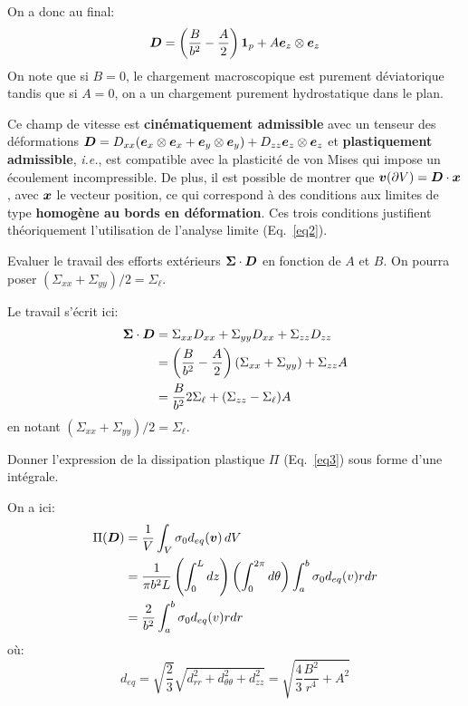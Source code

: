 \documentclass[french,12pt]{exam}
\begin{document}
\begin{questions}
\begin{solution}
On a donc au final:
$$\boldsymbol{D} = \left(\dfrac{B}{b^2}- \dfrac{A}{2}\right)\boldsymbol{1}_p + A\boldsymbol{e}_z\otimes\boldsymbol{e}_z$$
On note que si $B=0$, le chargement macroscopique est purement déviatorique tandis que si $A=0$, on a un chargement purement hydrostatique dans le plan.
\end{solution}

Ce champ de vitesse est \textbf{cinématiquement admissible} avec un tenseur des déformations $\boldsymbol{D} = D_{xx} (\boldsymbol{e}_x \otimes \boldsymbol{e}_x + \boldsymbol{e}_y \otimes \boldsymbol{e}_y) + D_{zz} \boldsymbol{e}_z \otimes \boldsymbol{e}_z $ et \textbf{plastiquement admissible}, \textit{i.e.}, est compatible avec la plasticité de von Mises qui impose un écoulement incompressible. De plus, il est possible de montrer que $\boldsymbol{v}(\partial V) = \boldsymbol{D} \cdot \boldsymbol{x}$, avec $\boldsymbol{x}$ le vecteur position, ce qui correspond à des conditions aux limites de type \textbf{homogène au bords en déformation}. Ces trois conditions justifient théoriquement l'utilisation de l'analyse limite (Eq.~\ref{eq2}). %


\question Evaluer le travail des efforts extérieurs $\boldsymbol{\Sigma} \cdot \boldsymbol{D}$ en fonction de $A$ et $B$. On pourra poser $(\Sigma_{xx}+\Sigma_{yy})/2= \Sigma_\ell$.
\begin{solution}
Le travail s'écrit ici:
\begin{eqnarray*}
\boldsymbol{\Sigma} \cdot \boldsymbol{D} &= \Sigma_{xx}D_{xx}+\Sigma_{yy}D_{xx}+\Sigma_{zz}D_{zz}\\
&= \left(\dfrac{B}{b^2}- \dfrac{A}{2}\right)(\Sigma_{xx}+\Sigma_{yy})+\Sigma_{zz}A \\
&= \dfrac{B}{b^2}2\Sigma_\ell + (\Sigma_{zz}-\Sigma_\ell)A
\end{eqnarray*} en notant $(\Sigma_{xx}+\Sigma_{yy})/2= \Sigma_\ell$.
\end{solution}

\question Donner l'expression de la dissipation plastique $\Pi$ (Eq.~\ref{eq3}) sous forme d'une intégrale.
\begin{solution}
On a ici:
\begin{align*}\Pi(\boldsymbol{D}) &= \frac{1}{V} \int_V \sigma_0 d_{eq}(\boldsymbol{v}) \,dV \\
&= \frac{1}{\pi b^2 L} \left(\int_0^L dz\right)\left(\int_0^{2\pi} d\theta\right)\int_a^b \sigma_0 d_{eq}(v) rdr\\
&= \frac{2}{b^2} \int_a^b \sigma_0 d_{eq}(v) rdr
\end{align*}
où:
$$d_{eq} = \sqrt{\dfrac{2}{3}}\sqrt{d_{rr}^2+d_{\theta\theta}^2+d_{zz}^2} = \sqrt{\dfrac{4}{3}\dfrac{B^2}{r^4}+A^2}$$
\end{solution}
\end{questions}
\end{document}

